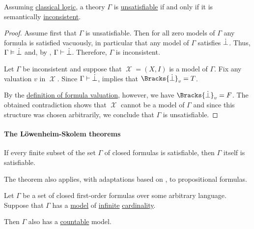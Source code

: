 \begin{proposition}\label{thm:formulas_unsatisfiable_iff_inconsistent}
   Assuming \hyperref[rem:classical_logic]{classical logic}, a theory \( \Gamma \) is \hyperref[def:propositional_model]{unsatisfiable} if and only if it is semantically \hyperref[def:first_order_theory/consistent]{inconsistent}.
\end{proposition}
\begin{proof}
  \SufficiencySubProof Assume first that \( \Gamma \) is unsatisfiable. Then for all zero models of \( \Gamma \) any formula is satisfied vacuously, in particular that any model of \( \Gamma \) satisfies \( \dot\bot \). Thus, \( \Gamma \vDash \dot\bot \) and, by , \( \Gamma \vdash \dot\bot \). Therefore, \( \Gamma \) is inconsistent.

  \NecessitySubProof Let \( \Gamma \) be inconsistent and suppose that \( \mscrX = (X, I) \) is a model of \( \Gamma \). Fix any valuation \( v \) in \( \mscrX \). Since \( \Gamma \vdash \dot\bot \),  implies that \( \Bracks{\synbot}_v = T \).

  By the \hyperref[def:first_order_valuation/formula_valuation]{definition of formula valuation}, however, we have \( \Bracks{\synbot}_v = F \). The obtained contradiction shows that \( \mscrX \) cannot be a model of \( \Gamma \) and since this structure was chosen arbitrarily, we conclude that \( \Gamma \) is unsatisfiable.
\end{proof}

\paragraph{The L\"owenheim-Skolem theorems}

\begin{theorem}\label{thm:first_order_compactness_theorem}
  If every finite subset of the set \( \Gamma \) of closed formulas is satisfiable, then \( \Gamma \) itself is satisfiable.
\end{theorem}
\begin{comments}
  \item The theorem also applies, with adaptations based on , to propositional formulas.
\end{comments}

\begin{theorem}\label{thm:downward_lowenheim_skolem_theorem}
  Let \( \Gamma \) be a set of closed first-order formulas over some arbitrary language. Suppose that \( \Gamma \) has a \hyperref[def:first_order_model]{model} of \hyperref[def:set_finiteness]{infinite} \hyperref[thm:cardinality_existence]{cardinality}.

  Then \( \Gamma \) also has a \hyperref[def:set_countability]{countable} model.
\end{theorem}

